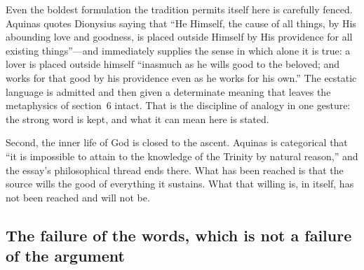 Even the boldest formulation the tradition permits itself here is carefully fenced. Aquinas quotes Dionysius saying that ``He Himself, the cause of all things, by His abounding love and goodness, is placed outside Himself by His providence for all existing things''---and immediately supplies the sense in which alone it is true: a lover is placed outside himself ``inasmuch as he wills good to the beloved; and works for that good by his providence even as he works for his own.'' The ecstatic language is admitted and then given a determinate meaning that leaves the metaphysics of section~6 intact. That is the discipline of analogy in one gesture: the strong word is kept, and what it can mean here is stated.

Second, the inner life of God is closed to the ascent. Aquinas is categorical that ``it is impossible to attain to the knowledge of the Trinity by natural reason,'' and the essay's philosophical thread ends there. What has been reached is that the source wills the good of everything it sustains. What that willing is, in itself, has not been reached and will not be.

\subsection{The failure of the words, which is not a failure of the argument}

